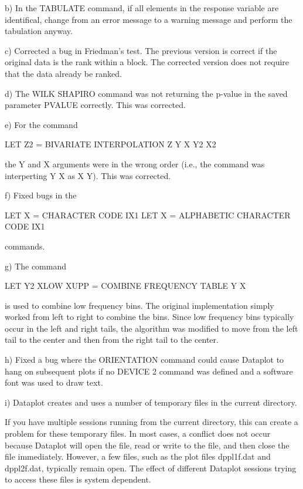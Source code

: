 {    b) In the TABULATE command, if all elements in the response
       variable are identifical, change from an error message to a
       warning message and perform the tabulation anyway.

    c) Corrected a bug in Friedman's test.  The previous version
       is correct if the original data is the rank within a block.
       The corrected version does not require that the data
       already be ranked.

    d) The WILK SHAPIRO command was not returning the p-value in
       the saved parameter PVALUE correctly.  This was corrected.

    e) For the command

          LET Z2 = BIVARIATE INTERPOLATION Z Y X Y2 X2

       the Y and X arguments were in the wrong order (i.e., the
       command was interperting Y X as X Y).  This was corrected.

    f) Fixed bugs in the 

          LET X = CHARACTER CODE IX1
          LET X = ALPHABETIC CHARACTER CODE IX1

       commands.

    g) The command 

           LET Y2 XLOW XUPP = COMBINE FREQUENCY TABLE Y X

       is used to combine low frequency bins.  The original
       implementation simply worked from left to right to
       combine the bins.  Since low frequency bins typically
       occur in the left and right tails, the algorithm was
       modified to move from the left tail to the center and
       then from the right tail to the center.

    h) Fixed a bug where the ORIENTATION command could cause
       Dataplot to hang on subsequent plots if no DEVICE 2
       command was defined and a software font was used to
       draw text.

    i) Dataplot creates and uses a number of temporary files
       in the current directory.

       If you have multiple sessions running from the current
       directory, this can create a problem for these temporary
       files.  In most cases, a conflict does not occur because
       Dataplot will open the file, read or write to the file,
       and then close the file immediately.  However, a few
       files, such as the plot files dppl1f.dat and dppl2f.dat,
       typically remain open.  The effect of different Dataplot
       sessions trying to access these files is system dependent.

}
